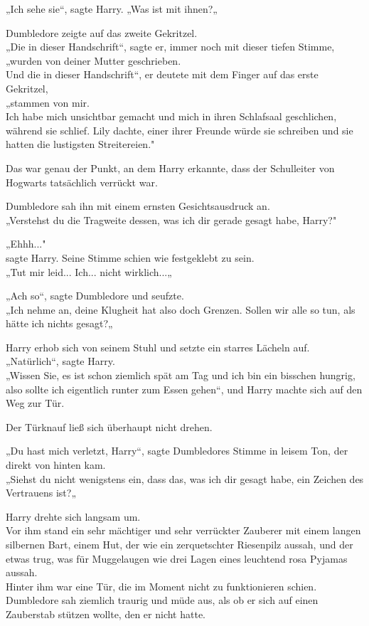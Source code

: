 {„Ich sehe sie“, sagte Harry. „Was ist mit ihnen?„

Dumbledore zeigte auf das zweite Gekritzel.\\ „Die in dieser Handschrift“, sagte er, immer noch mit dieser tiefen Stimme,\\ „wurden von deiner Mutter geschrieben.\\ Und die in dieser Handschrift“, er deutete mit dem Finger auf das erste Gekritzel,\\ „stammen von mir.\\ Ich habe mich unsichtbar gemacht und mich in ihren Schlafsaal geschlichen, während sie schlief. Lily dachte, einer ihrer Freunde würde sie schreiben und sie hatten die lustigsten Streitereien."

Das war genau der Punkt, an dem Harry erkannte, dass der Schulleiter von Hogwarts tatsächlich verrückt war.

Dumbledore sah ihn mit einem ernsten Gesichtsausdruck an.\\ „Verstehst du die Tragweite dessen, was ich dir gerade gesagt habe, Harry?"

„Ehhh..."\\ sagte Harry. Seine Stimme schien wie festgeklebt zu sein.\\ „Tut mir leid... Ich... nicht wirklich...„

„Ach so“, sagte Dumbledore und seufzte.\\ „Ich nehme an, deine Klugheit hat also doch Grenzen. Sollen wir alle so tun, als hätte ich nichts gesagt?„

Harry erhob sich von seinem Stuhl und setzte ein starres Lächeln auf.\\ „Natürlich“, sagte Harry.\\ „Wissen Sie, es ist schon ziemlich spät am Tag und ich bin ein bisschen hungrig, also sollte ich eigentlich runter zum Essen gehen“, und Harry machte sich auf den Weg zur Tür.

Der Türknauf ließ sich überhaupt nicht drehen.

„Du hast mich verletzt, Harry“, sagte Dumbledores Stimme in leisem Ton, der direkt von hinten kam.\\ „Siehst du nicht wenigstens ein, dass das, was ich dir gesagt habe, ein Zeichen des Vertrauens ist?„

Harry drehte sich langsam um.\\ Vor ihm stand ein sehr mächtiger und sehr verrückter Zauberer mit einem langen silbernen Bart, einem Hut, der wie ein zerquetschter Riesenpilz aussah, und der etwas trug, was für Muggelaugen wie drei Lagen eines leuchtend rosa Pyjamas aussah.\\ Hinter ihm war eine Tür, die im Moment nicht zu funktionieren schien. Dumbledore sah ziemlich traurig und müde aus, als ob er sich auf einen Zauberstab stützen wollte, den er nicht hatte.

}
